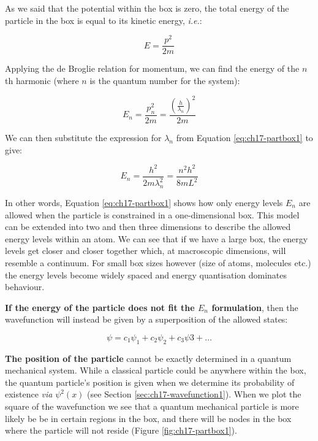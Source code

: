 \documentclass[
]{book}
\begin{document}
As we said that the potential within the box is zero, the total energy of the particle in the box is equal to its kinetic energy, \emph{i.e.}:

\begin{equation}
E = \frac{p^2}{2m}
\end{equation}

Applying the de Broglie relation for momentum, we can find the energy of the \(n\)th harmonic (where \(n\) is the quantum number for the system):

\begin{equation}
E_n = \frac{p_n^2}{2m} = \frac{\left(\frac{h}{\lambda_n}\right)^2}{2m}
\end{equation}

We can then substitute the expression for \(\lambda_n\) from Equation \eqref{eq:ch17-partbox1} to give:

\begin{equation}
E_n = \frac{h^2}{2m\lambda_n^2} = \frac{n^2 h^2}{8mL^2}
\label{eq:ch17-partbox2}
\end{equation}

In other words, Equation \eqref{eq:ch17-partbox1} shows how only energy levels \(E_n\) are allowed when the particle is constrained in a one-dimensional box. This model can be extended into two and then three dimensions to describe the allowed energy levels within an atom. We can see that if we have a large box, the energy levels get closer and closer together which, at macroscopic dimensions, will resemble a continuum. For small box sizes however (size of atoms, molecules etc.) the energy levels become widely spaced and energy quantisation dominates behaviour.

\textbf{If the energy of the particle does not fit the \(E_n\) formulation}, then the wavefunction will instead be given by a superposition of the allowed states:

\begin{equation}
\psi = c_1\psi_1 + c_2\psi_2 + c_3\psi3 + \dots
\end{equation}

\textbf{The position of the particle} cannot be exactly determined in a quantum mechanical system. While a classical particle could be anywhere within the box, the quantum particle's position is given when we determine its probability of existence \emph{via} \(\psi^2(x)\) (see Section \ref{sec:ch17-wavefunction1}). When we plot the square of the wavefunction we see that a quantum mechanical particle is more likely be be in certain regions in the box, and there will be nodes in the box where the particle will not reside (Figure \ref{fig:ch17-partbox1}).
\end{document}
